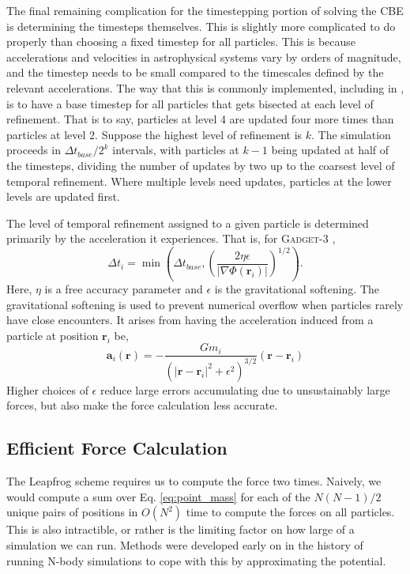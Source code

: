 The final remaining complication for the timestepping portion of solving the CBE is determining the timesteps themselves. This is slightly more complicated to do properly than choosing a fixed timestep for all particles. This is because accelerations and velocities in astrophysical systems vary by orders of magnitude, and the timestep needs to be small compared to the timescales defined by the relevant accelerations. The way that this is commonly implemented, including in \citet{GadgetCodePaper}, is to have a base timestep for all particles that gets bisected at each level of refinement. That is to say, particles at level 4 are updated four more times than particles at level 2. Suppose the highest level of refinement is $k$. The simulation proceeds in $\Delta t_{base} / 2^{k}$ intervals, with particles at $k - 1$ being updated at half of the timesteps, dividing the number of updates by two up to the coarsest level of temporal refinement. Where multiple levels need updates, particles at the lower levels are updated first.

The level of temporal refinement assigned to a given particle is determined primarily by the acceleration it experiences. That is, for \textsc{Gadget-3} \citep{GadgetCodePaper},
\begin{equation}
\Delta t_i = \min\left(\Delta t_{base}, \left(\frac{2 \eta \epsilon}{\vert \nabla \Phi(\textbf{r}_i) \vert} \right)^{1/2}\right).
\end{equation}
Here, $\eta$ is a free accuracy parameter and $\epsilon$ is the gravitational softening. The gravitational softening is used to prevent numerical overflow when particles rarely have close encounters. It arises from having the acceleration induced from a particle at position $\textbf{r}_i$  be,
\begin{equation}
\textbf{a}_i(\textbf{r}) = -\frac{G m_i}{\left(\vert\textbf{r} - \textbf{r}_i\vert^2 + \epsilon^2\right)^{3/2}}(\textbf{r} - \textbf{r}_i) \label{eq:point_mass}
\end{equation}
Higher choices of $\epsilon$ reduce large errors accumulating due to unsustainably large forces, but also make the force calculation less accurate.

\subsection{Efficient Force Calculation}

The Leapfrog scheme requires us to compute the force two times. Naively, we would compute a sum over Eq. \eqref{eq:point_mass} for each of the $N(N-1)/2$ unique pairs of positions in $O(N^2)$ time to compute the forces on all particles. This is also intractible, or rather is the limiting factor on how large of a simulation we can run. Methods were developed early on in the history of running N-body simulations to cope with this by approximating the potential.

